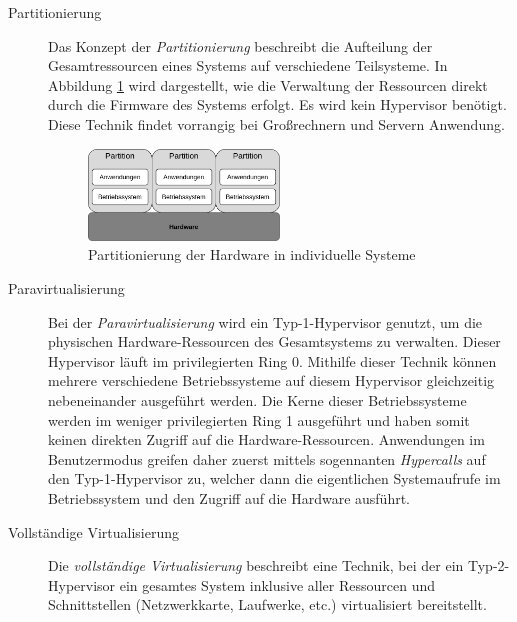 \begin{description}
    \item[Partitionierung]
        Das Konzept der \textit{Partitionierung} beschreibt die Aufteilung der
        Gesamtressourcen eines Systems auf verschiedene
        Teilsysteme\cite{BSKompakt_Virt}.
        In Abbildung \ref{fig:Partitionierung} wird dargestellt, wie die
        Verwaltung der Ressourcen direkt durch die Firmware des Systems
        erfolgt.
        Es wird kein Hypervisor benötigt.
        Diese Technik findet vorrangig bei Großrechnern und Servern Anwendung.
        \begin{figure}[!htb]
            \centering
            \includegraphics[width=0.5\textwidth]{anlagen/bilder/Partitionierung}
            \caption{Partitionierung der Hardware in individuelle
            Systeme\cite{PartAbb_BSKompakt}}
            \label{fig:Partitionierung}
        \end{figure}
    \item[Paravirtualisierung]
        Bei der \textit{Paravirtualisierung} wird ein Typ-1-Hypervisor genutzt,
        um die physischen Hardware-Ressourcen des Gesamtsystems zu verwalten.
        Dieser Hypervisor läuft im privilegierten Ring 0.
        Mithilfe dieser Technik können mehrere verschiedene Betriebssysteme auf
        diesem Hypervisor gleichzeitig nebeneinander ausgeführt
        werden\cite{BSGK_RBrause}.
        Die Kerne dieser Betriebssysteme werden im weniger privilegierten Ring
        1 ausgeführt und haben somit keinen direkten Zugriff auf die
        Hardware-Ressourcen.
        Anwendungen im Benutzermodus greifen daher zuerst mittels sogennanten
        \textit{Hypercalls} auf den Typ-1-Hypervisor zu, welcher dann die
        eigentlichen Systemaufrufe im Betriebssystem und den Zugriff auf die
        Hardware ausführt\cite{BSKompakt_Virt}.
    \item[Vollständige Virtualisierung]
        Die \textit{vollständige Virtualisierung} beschreibt eine Technik, bei
        der ein Typ-2-Hypervisor ein gesamtes System inklusive aller Ressourcen
        und Schnittstellen (Netzwerkkarte, Laufwerke, etc.) virtualisiert
        bereitstellt\cite{BSKompakt_Virt}.

\end{description}
